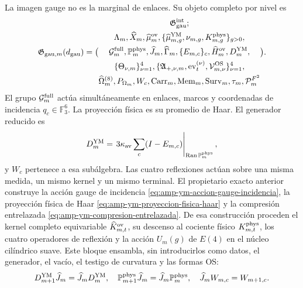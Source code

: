 La imagen gauge no es la marginal de enlaces. Su objeto completo por nivel es
\begin{equation}\label{eq:pdf2-g-gau-explicito}
 \mathfrak G_{{\rm gau},m}(d_{\rm gau})=
 \bigl(
 \begin{gathered}
  \mathfrak G_{\rm gau}^{\rm int};\\
  \Lambda_m,\widehat X_m,\widehat\mu_m^{\rm ov},
  \{\widehat\mu_{m,g}^{\rm YM},\nu_{m,g},K_{m,g}^{\rm phys}\}_{g>0},\\
  \mathcal G_m^{\rm full},\mathbb P_m^{\rm phys},
  \widehat J_m,\widehat\Gamma_m,
  \{E_{m,c}\}_c,\widehat H_m^{\rm ov},D_m^{\rm YM},\\
  \{\Theta_{\nu,m}\}_{\nu=1}^4,
  \{\mathfrak A_{+,\nu,m},\operatorname{ev}_{t}^{(\nu)},
      \mathcal V_{m,\nu}^{\rm OS}\}_{\nu=1}^4,\\
  \widehat\Omega_m^{(8)},P_{\Omega_m},W_c,
  \operatorname{Carr}_m,\operatorname{Mem}_m,
  \operatorname{Surv}_m,\tau_m,\mathcal P_m^{F^2}
 \end{gathered}
 \bigr).
\end{equation}
El grupo $\mathcal G_m^{\rm full}$ actúa simultáneamente en enlaces, marcos y
coordenadas de incidencia $q_c\in\mathbb F_3^6$. La proyección física es su promedio
de Haar. El generador reducido es
\begin{equation}\label{eq:pdf2-g-gau-generador-estructural}
 D_m^{\rm YM}
 =\left.3\kappa_{\rm av}\sum_c(I-E_{m,c})
  \right|_{\operatorname{Ran}\mathbb P_m^{\rm phys}},
\end{equation}
y $W_c$ pertenece a esa subálgebra. Las cuatro reflexiones actúan sobre una misma
medida, un mismo kernel y un mismo terminal.
El propietario exacto anterior construye la acción gauge de incidencia
\eqref{eq:amp-ym-accion-gauge-incidencia}, la proyección física de Haar
\eqref{eq:amp-ym-proyeccion-fisica-haar} y la compresión entrelazada
\eqref{eq:amp-ym-compresion-entrelazada}. De esa construcción proceden el
kernel completo equivariable $\widehat K_{m,t}^{\rm ov}$, su descenso al
cociente físico $K_{m,t}^{\rm phys}$, los cuatro operadores de reflexión y
la acción $U_m(g)$ de $E(4)$ en el núcleo cilíndrico suave. Este bloque
ensambla, sin introducirlos como datos, el generador, el vacío, el testigo
de curvatura y las formas OS:
\begin{equation}\label{eq:pdf2-g-gau-entrelazamiento-dato}
 D_{m+1}^{\rm YM}\widehat J_m=\widehat J_mD_m^{\rm YM},
 \quad
 \mathbb P_{m+1}^{\rm phys}\widehat J_m
  =\widehat J_m\mathbb P_m^{\rm phys},
 \quad
 \widehat J_mW_{m,c}=W_{m+1,c}.
\end{equation}
